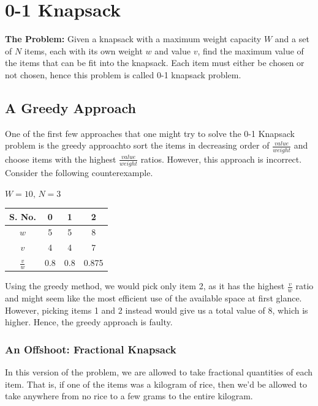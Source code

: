 \documentclass[12pt, a4paper]{article}
\theoremstyle{definition}
\theoremstyle{remark}
\begin{document}
\section{0-1 Knapsack}
\begin{tcolorbox}
    \textbf{The Problem:} Given a knapsack with a maximum weight capacity $W$ and a set of $N$ items, each with its own weight $w$ and value $v$, find the maximum value of the items that can be fit into the knapsack. Each item must either be chosen or not chosen, hence this problem is called 0-1 knapsack problem.
\end{tcolorbox}

\subsection{A Greedy Approach}
One of the first few approaches that one might try to solve the 0-1 Knapsack problem is the greedy approach\textemdash to sort the items in decreasing order of $\frac{value}{weight}$ and choose items with the highest $\frac{value}{weight}$ ratios. However, this approach is incorrect. Consider the following counterexample.

\begin{center}
    $W = 10,\, N = 3$ \par
    \begin{tabular}{c | c | c | c}
        \hline
        S. No.        & 0   & 1   & 2     \\
        \hline
        $w$           & 5   & 5   & 8     \\
        $v$           & 4   & 4   & 7     \\
        $\frac{v}{w}$ & 0.8 & 0.8 & 0.875
    \end{tabular}
\end{center}
Using the greedy method, we would pick only item 2, as it has the highest $\frac{v}{w}$ ratio and might seem like the most efficient use of the available space at first glance. However, picking items 1 and 2 instead would give us a total value of 8, which is higher. Hence, the greedy approach is faulty.

\subsubsection{An Offshoot: Fractional Knapsack}
In this version of the problem, we are allowed to take fractional quantities of each item. That is, if one of the items was a kilogram of rice, then we'd be allowed to take anywhere from no rice to a few grams to the entire kilogram.
\end{document}
